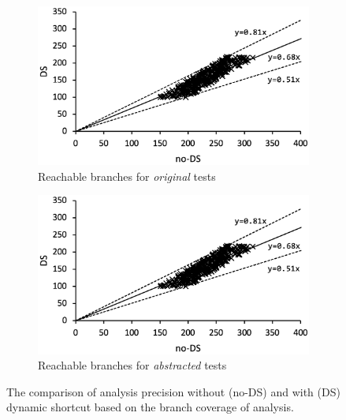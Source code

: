 \begin{figure}
  \centering
  \begin{subfigure}[t]{0.48\textwidth}
    \includegraphics[width=\linewidth]{img/conc-precision}
    \vspace*{-1.5em}
    \caption{Reachable branches for  \textit{original} tests}
    \label{fig:precision-fail}
  \end{subfigure}
  \begin{subfigure}[t]{0.48\textwidth}
    \includegraphics[width=\linewidth]{img/abs-precision}
    \vspace*{-1.5em}
    \caption{Reachable branches for  \textit{abstracted} tests}
    \label{fig:precision-branch}
  \end{subfigure}
  \vspace*{-1em}
  \caption{The comparison of analysis precision without (no-DS) and with (DS)
  dynamic shortcut based on the branch coverage of analysis.}
  \label{fig:precision}
  \vspace*{-1.5em}
\end{figure}

